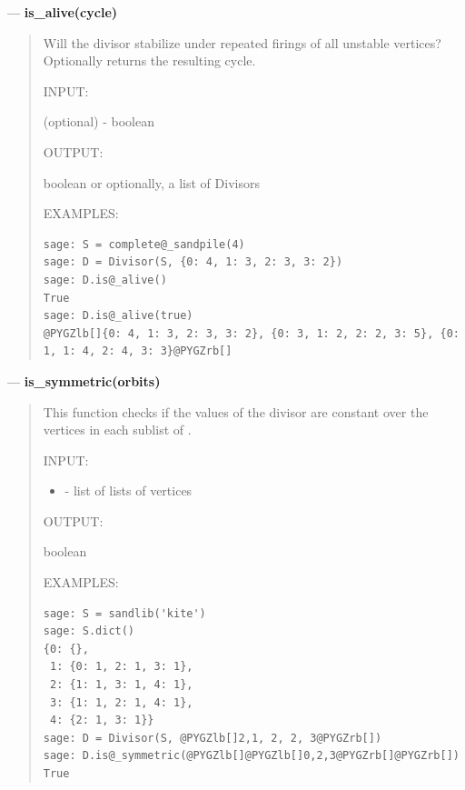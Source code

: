 \documentclass[letterpaper,10pt,english]{manual}
\begin{document}
---
\hypertarget{is-alive-cycle}{}
\textbf{is\_alive(cycle)}
\begin{quote}

Will the divisor stabilize under repeated firings of all unstable
vertices?  Optionally returns the resulting cycle.

INPUT:

 (optional) - boolean

OUTPUT:

boolean or optionally, a list of Divisors

EXAMPLES:

\begin{Verbatim}[commandchars=@\[\]]
sage: S = complete@_sandpile(4)
sage: D = Divisor(S, {0: 4, 1: 3, 2: 3, 3: 2})
sage: D.is@_alive()
True
sage: D.is@_alive(true)
@PYGZlb[]{0: 4, 1: 3, 2: 3, 3: 2}, {0: 3, 1: 2, 2: 2, 3: 5}, {0: 1, 1: 4, 2: 4, 3: 3}@PYGZrb[]
\end{Verbatim}
\end{quote}

---
\hypertarget{is-symmetric-orbits-divisor}{}
\textbf{is\_symmetric(orbits)}
\begin{quote}

This function checks if the values of the divisor are constant
over the vertices in each sublist of .

INPUT:
\begin{itemize}
\item {} 
 - list of lists of vertices

\end{itemize}

OUTPUT:

boolean

EXAMPLES:

\begin{Verbatim}[commandchars=@\[\]]
sage: S = sandlib('kite')
sage: S.dict()
{0: {},
 1: {0: 1, 2: 1, 3: 1},
 2: {1: 1, 3: 1, 4: 1},
 3: {1: 1, 2: 1, 4: 1},
 4: {2: 1, 3: 1}}
sage: D = Divisor(S, @PYGZlb[]2,1, 2, 2, 3@PYGZrb[])
sage: D.is@_symmetric(@PYGZlb[]@PYGZlb[]0,2,3@PYGZrb[]@PYGZrb[])
True
\end{Verbatim}
\end{quote}
\end{document}
